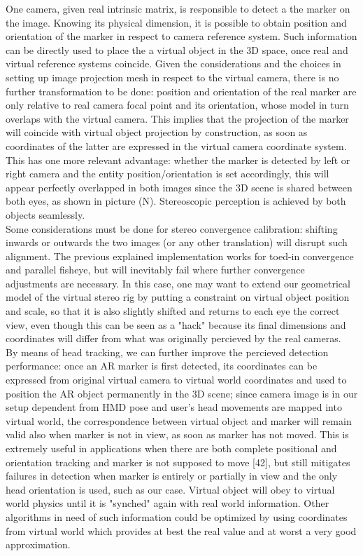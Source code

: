 One camera, given real intrinsic matrix, is responsible to detect a the marker on the image. Knowing its physical dimension, it is possible to obtain position and orientation of the marker in respect to camera reference system. Such information can be directly used to place the a virtual object in the 3D space, once real and virtual reference systems coincide. Given the considerations and the choices in setting up image projection mesh in respect to the virtual camera, there is no further transformation to be done: position and orientation of the real marker are only relative to real camera focal point and its orientation, whose model in turn overlaps with the virtual camera. This implies that the projection of the marker will coincide with virtual object projection by construction, as soon as coordinates of the latter are expressed in the virtual camera coordinate system. This has one more relevant advantage: whether the marker is detected by left or right camera and the entity position/orientation is set accordingly, this will appear perfectly overlapped in both images since the 3D scene is shared between both eyes, as shown in picture (N). Stereoscopic perception is achieved by both objects seamlessly.\\
Some considerations must be done for stereo convergence calibration: shifting inwards or outwards the two images (or any other translation) will disrupt such alignment. The previous explained implementation works for toed-in convergence and parallel fisheye, but will inevitably fail where further convergence adjustments are necessary. In this case, one may want to extend our geometrical model of the virtual stereo rig by putting a constraint on virtual object position and scale, so that it is also slightly shifted and returns to each eye the correct view, even though this can be seen as a "hack" because its final dimensions and coordinates will differ from what was originally percieved by the real cameras.\\
By means of head tracking, we can further improve the percieved detection performance: once an AR marker is first detected, its coordinates can be expressed from original virtual camera to virtual world coordinates and used to position the AR object permanently in the 3D scene; since camera image is in our setup dependent from HMD pose and user’s head movements are mapped into virtual world, the correspondence between virtual object and marker will remain valid also when marker is not in view, as soon as marker has not moved. This is extremely useful in applications when there are both complete positional and orientation tracking and marker is not supposed to move [42], but still mitigates failures in detection when marker is entirely or partially in view and the only head orientation is used, such as our case. Virtual object will obey to virtual world physics until it is "synched" again with real world information. Other algorithms in need of such information could be optimized by using coordinates from virtual world which provides at best the real value and at worst a very good approximation.

